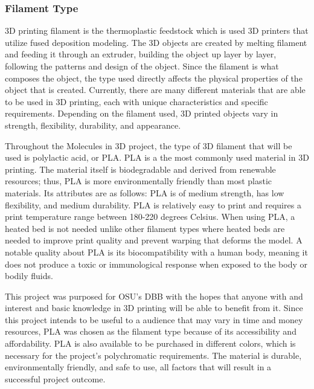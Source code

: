 \documentclass[letterpaper, onecolumn, draftclsnofoot, 10pt, compsoc]{IEEEtran}
\begin{document}
\begin{singlespace}
        \subsubsection{Filament Type}
     3D printing filament is the thermoplastic feedstock which is used 3D printers that utilize fused deposition modeling. 
     The 3D objects are created by melting filament and feeding it through an extruder, building the object up layer by layer, following the patterns and design of the object.
	Since the filament is what composes the object, the type used directly affects the physical properties of the object that is created. 
	Currently, there are many different materials that are able to be used in 3D printing, each with unique characteristics and specific requirements.
	Depending on the filament used, 3D printed objects vary in strength, flexibility, durability, and appearance. \par
	Throughout the Molecules in 3D project, the type of 3D filament that will be used is polylactic acid, or PLA. 
	PLA is a the most commonly used material in 3D printing. 
	The material itself is biodegradable and derived from renewable resources; thus, PLA is more environmentally friendly than most plastic materials. 
	Its attributes are as follows: PLA is of medium strength, has low flexibility, and medium durability. 
	PLA is relatively easy to print and requires a print temperature range between 180-220 degrees Celsius.  
	When using PLA, a heated bed is not needed unlike other filament types where heated beds are needed to improve print quality and prevent warping that deforms the model.\cite{heatbedweb}
	A notable quality about PLA is its biocompatibility with a human body, meaning it does not produce a toxic or immunological response when exposed to the body or bodily fluids.\cite{filamentweb}\par
    This project was purposed for OSU's DBB with the hopes that anyone with and interest and basic knowledge in 3D printing will be able to benefit from it. 
   Since this project intends to be useful to a audience that may vary in time and money resources, PLA was chosen as the filament type because of its accessibility and affordability. 
	PLA is also available to be purchased in different colors, which is necessary for the project's polychromatic requirements. 
    The material is durable, environmentally friendly, and safe to use, all factors that will result in a successful project outcome.
  

\end{singlespace}
\end{document}
